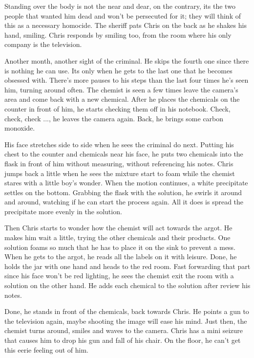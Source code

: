         Standing over the body is not the near and dear, on the contrary, its the two people that wanted him dead and won't be persecuted for it;
    they will think of this as a necessary homocide. The sheriff pats Chris on the back as he shakes his hand, smiling. Chris responds by smiling
    too, from the room where his only company is the television.

        Another month, another sight of the criminal. He skips the fourth one since there is nothing he can use. Its only when he gets to the
    last one that he becomes obsessed with. There's more pauses to his steps than the last four times he's seen him, turning around often. The
    chemist is seen a few times leave the camera's area and come back with a new chemical. After he places the chemicals on the counter in front
    of him, he starts checking them off in his notebook. Check, check, check ..., he leaves the camera again. Back, he brings some carbon
    monoxide.

        His face stretches side to side when he sees the criminal do next. Putting his chest to the counter and chemicals near his face, he puts
    two chemicals into the flask in front of him without measuring, without referencing his notes. Chris jumps back a little when he sees the
    mixture start to foam while the chemist stares with a little boy's wonder. When the motion continues, a white precipitate settles on the 
    bottom. Grabbing the flask with the solution, he swirls it around and around, watching if he can start the process again. All it does is
    spread the precipitate more evenly in the solution.

        Then Chris starts to wonder how the chemist will act towards the argot. He makes him wait a little, trying the other chemicals and their
    products. One solution foams so much that he has to place it on the sink to prevent a mess. When he gets to the argot, he reads all the
    labels on it with leisure. Done, he holds the jar with one hand and heads to the red room. Fast forwarding that part since his face won't
    be red lighting, he sees the chemist exit the room with a solution on the other hand. He adds each chemical to the solution after review his
    notes.

        Done, he stands in front of the chemicals, back towards Chris. He points a gun to the television again, maybe shooting the image will
    ease his mind. Just then, the chemist turns around, smiles and waves to the camera. Chris has a mini seizure that causes him to drop his
    gun and fall of his chair. On the floor, he can't get this eerie feeling out of him.

